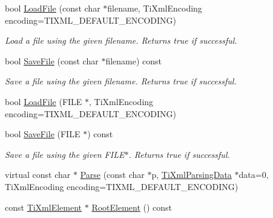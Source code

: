 \begin{DoxyCompactItemize}
\mbox{\label{classTiXmlDocument_a879cdf5e981b8b2d2ef82f2546dd28fb}} 
bool \hyperlink{classTiXmlDocument_a879cdf5e981b8b2d2ef82f2546dd28fb}{Load\+File} (const char $\ast$filename, Ti\+Xml\+Encoding encoding=T\+I\+X\+M\+L\+\_\+\+D\+E\+F\+A\+U\+L\+T\+\_\+\+E\+N\+C\+O\+D\+I\+NG)
\begin{DoxyCompactList}\small\item\em Load a file using the given filename. Returns true if successful. \end{DoxyCompactList}\item 
\mbox{\label{classTiXmlDocument_ae641f33784381017c44e107cc2c86b5c}} 
bool \hyperlink{classTiXmlDocument_ae641f33784381017c44e107cc2c86b5c}{Save\+File} (const char $\ast$filename) const
\begin{DoxyCompactList}\small\item\em Save a file using the given filename. Returns true if successful. \end{DoxyCompactList}\item 
bool \hyperlink{classTiXmlDocument_a41f6fe7200864d1dca663d230caf8db6}{Load\+File} (F\+I\+LE $\ast$, Ti\+Xml\+Encoding encoding=T\+I\+X\+M\+L\+\_\+\+D\+E\+F\+A\+U\+L\+T\+\_\+\+E\+N\+C\+O\+D\+I\+NG)
\item 
\mbox{\label{classTiXmlDocument_a8f5a1022168a5767e32becec7b6f44ee}} 
bool \hyperlink{classTiXmlDocument_a8f5a1022168a5767e32becec7b6f44ee}{Save\+File} (F\+I\+LE $\ast$) const
\begin{DoxyCompactList}\small\item\em Save a file using the given F\+I\+L\+E$\ast$. Returns true if successful. \end{DoxyCompactList}\item 
virtual const char $\ast$ \hyperlink{classTiXmlDocument_a789ad2f06f93d52bdb5570b2f3670289}{Parse} (const char $\ast$p, \hyperlink{classTiXmlParsingData}{Ti\+Xml\+Parsing\+Data} $\ast$data=0, Ti\+Xml\+Encoding encoding=T\+I\+X\+M\+L\+\_\+\+D\+E\+F\+A\+U\+L\+T\+\_\+\+E\+N\+C\+O\+D\+I\+NG)
\item 
const \hyperlink{classTiXmlElement}{Ti\+Xml\+Element} $\ast$ \hyperlink{classTiXmlDocument_ab54e3a93279fcf0ac80f06ed9c52f04a}{Root\+Element} () const
\item 
\mbox{\label{classTiXmlDocument_a0b43e762a23f938b06651bc90b8a1013}} 

\end{DoxyCompactItemize}
